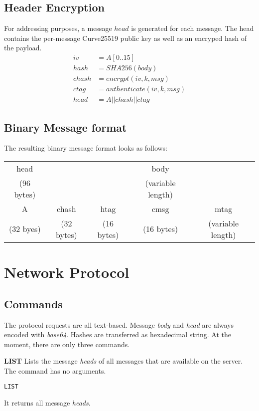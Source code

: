 \documentclass[a4paper]{article}
\begin{document}
\subsection{Header Encryption}
For addressing purposes, a message $head$ is generated for each message. The
head contains the per-message Curve25519 public key as well as an encryped hash
of the payload.
\begin{align*}
iv    &= A[0..15]\\
hash  &= SHA256(body) \\
chash &= encrypt(iv, k, msg) \\
ctag  &= authenticate(iv, k, msg) \\
head  &= A || chash || ctag
\end{align*}

\subsection{Binary Message format}
The resulting binary message format looks as follows:
\begin{center}
\begin{tabular}{ |ccc|cc| }
 \hline
 head &&& body & \\
 (96 bytes) &&& (variable length) & \\
 \hline
 A & chash & htag & cmsg & mtag \\
 (32 byes) & (32 bytes) & (16 bytes) & (16 bytes) & (variable length) \\
 \hline
\end{tabular}
\end{center}

\section{Network Protocol}

\subsection{Commands}
The protocol requests are all text-based. Message \textit{body} and
\textit{head} are always encoded with \textit{base64}. Hashes are transferred as
hexadecimal string. At the moment, there are only three commands.

\textbf{LIST} Lists the message \textit{heads} of all messages that are
available on the server. The command has no arguments.
\begin{verbatim}
LIST
\end{verbatim}
It returns all message \textit{heads}.
\end{document}
